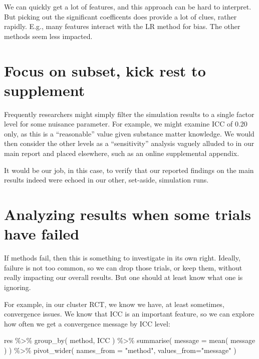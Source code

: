 \documentclass[
]{book}
\newenvironment{Shaded}{\begin{snugshade}}{\end{snugshade}}
\newcommand{\AttributeTok}[1]{\textcolor[rgb]{0.77,0.63,0.00}{#1}}
\newcommand{\FunctionTok}[1]{\textcolor[rgb]{0.00,0.00,0.00}{#1}}
\newcommand{\NormalTok}[1]{#1}
\newcommand{\SpecialCharTok}[1]{\textcolor[rgb]{0.00,0.00,0.00}{#1}}
\newcommand{\StringTok}[1]{\textcolor[rgb]{0.31,0.60,0.02}{#1}}
\begin{document}
We can quickly get a lot of features, and this approach can be hard to interpret. But picking out the significant coefficents does provide a lot of clues, rather rapidly.
E.g., many features interact with the LR method for bias. The other methods seem less impacted.

\hypertarget{focus-on-subset-kick-rest-to-supplement}{%
\section{Focus on subset, kick rest to supplement}\label{focus-on-subset-kick-rest-to-supplement}}

Frequently researchers might simply filter the simulation results to a single factor level for some nuisance parameter.
For example, we might examine ICC of 0.20 only, as this is a ``reasonable'' value given substance matter knowledge.
We would then consider the other levels as a ``sensitivity'' analysis vaguely alluded to in our main report and placed elsewhere, such as an online supplemental appendix.

It would be our job, in this case, to verify that our reported findings on the main results indeed were echoed in our other, set-aside, simulation runs.

\hypertarget{analyzing-results-when-some-trials-have-failed}{%
\section{Analyzing results when some trials have failed}\label{analyzing-results-when-some-trials-have-failed}}

If methods fail, then this is something to investigate in its own right.
Ideally, failure is not too common, so we can drop those trials, or keep them, without really impacting our overall results.
But one should at least know what one is ignoring.

For example, in our cluster RCT, we know we have, at least sometimes, convergence issues.
We know that ICC is an important feature, so we can explore how often we get a convergence message by ICC level:

\begin{Shaded}
\begin{Highlighting}[]
\NormalTok{res }\SpecialCharTok{\%\textgreater{}\%} 
  \FunctionTok{group\_by}\NormalTok{( method, ICC ) }\SpecialCharTok{\%\textgreater{}\%}
  \FunctionTok{summarise}\NormalTok{( }\AttributeTok{message =} \FunctionTok{mean}\NormalTok{( message ) ) }\SpecialCharTok{\%\textgreater{}\%}
  \FunctionTok{pivot\_wider}\NormalTok{( }\AttributeTok{names\_from =} \StringTok{"method"}\NormalTok{, }\AttributeTok{values\_from=}\StringTok{"message"}\NormalTok{ )}
\end{Highlighting}
\end{Shaded}
\end{document}
